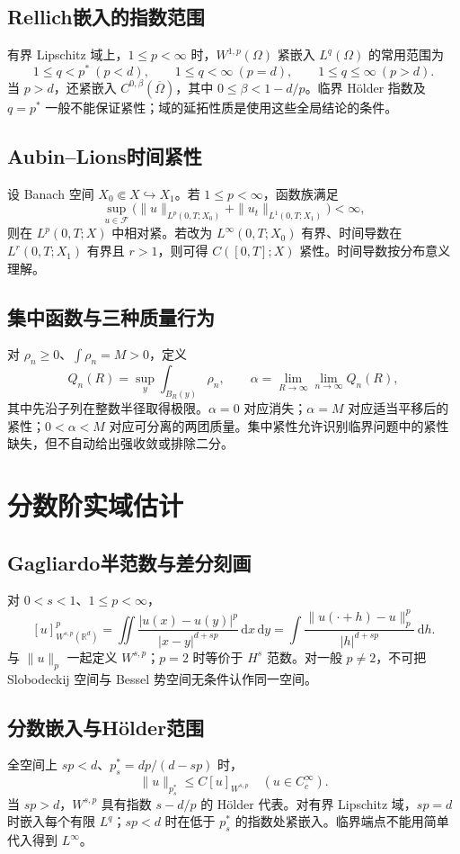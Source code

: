 \documentclass[../main.tex]{subfiles}
\begin{document}
\subsection{Rellich嵌入的指数范围}
有界 Lipschitz 域上，$1\le p<\infty$ 时，$W^{1,p}(\Omega)$ 紧嵌入 $L^q(\Omega)$ 的常用范围为
\[
1\le q<p^*\ (p<d),\qquad1\le q<\infty\ (p=d),\qquad1\le q\le\infty\ (p>d).
\]
当 $p>d$，还紧嵌入 $C^{0,\beta}(\overline\Omega)$，其中 $0\le\beta<1-d/p$。临界 Hölder 指数及 $q=p^*$ 一般不能保证紧性；域的延拓性质是使用这些全局结论的条件。
\subsection{Aubin--Lions时间紧性}
设 Banach 空间 $X_0\Subset X\hookrightarrow X_1$。若 $1\le p<\infty$，函数族满足
\[
\sup_{u\in\mathcal F}\bigl(\|u\|_{L^p(0,T;X_0)}+\|u_t\|_{L^1(0,T;X_1)}\bigr)<\infty,
\]
则在 $L^p(0,T;X)$ 中相对紧。若改为 $L^\infty(0,T;X_0)$ 有界、时间导数在 $L^r(0,T;X_1)$ 有界且 $r>1$，则可得 $C([0,T];X)$ 紧性。时间导数按分布意义理解。
\subsection{集中函数与三种质量行为}
对 $\rho_n\ge0$、$\int\rho_n=M>0$，定义
\[
Q_n(R)=\sup_y\int_{B_R(y)}\rho_n,\qquad
\alpha=\lim_{R\to\infty}\lim_{n\to\infty}Q_n(R),
\]
其中先沿子列在整数半径取得极限。$\alpha=0$ 对应消失；$\alpha=M$ 对应适当平移后的紧性；$0<\alpha<M$ 对应可分离的两团质量。集中紧性允许识别临界问题中的紧性缺失，但不自动给出强收敛或排除二分。
\section{分数阶实域估计}\label{sec:ra-fractional}
\subsection{Gagliardo半范数与差分刻画}
对 $0<s<1$、$1\le p<\infty$，
\[
[u]_{W^{s,p}(\mathbb R^d)}^p=\iint\frac{|u(x)-u(y)|^p}{|x-y|^{d+sp}}\,\mathrm dx\,\mathrm dy
=\int\frac{\|u(\cdot+h)-u\|_p^p}{|h|^{d+sp}}\,\mathrm dh.
\]
与 $\|u\|_p$ 一起定义 $W^{s,p}$；$p=2$ 时等价于 $H^s$ 范数。对一般 $p\ne2$，不可把 Slobodeckij 空间与 Bessel 势空间无条件认作同一空间。
\subsection{分数嵌入与Hölder范围}
全空间上 $sp<d$、$p_s^*=dp/(d-sp)$ 时，
\[
\|u\|_{p_s^*}\le C[u]_{W^{s,p}}\quad(u\in C_c^\infty).
\]
当 $sp>d$，$W^{s,p}$ 具有指数 $s-d/p$ 的 Hölder 代表。对有界 Lipschitz 域，$sp=d$ 时嵌入每个有限 $L^q$；$sp<d$ 时在低于 $p_s^*$ 的指数处紧嵌入。临界端点不能用简单代入得到 $L^\infty$。
\end{document}
